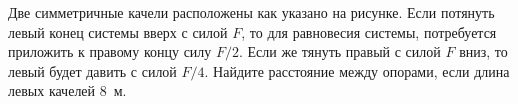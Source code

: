 Две симметричные качели расположены как указано на рисунке. Если потянуть левый конец системы вверх с силой $F$, то для равновесия системы, потребуется приложить к правому концу силу $F/2$. Если же тянуть правый с силой $F$ вниз, то левый будет давить с силой $F/4$. Найдите расстояние между опорами, если длина левых качелей $8$~м.